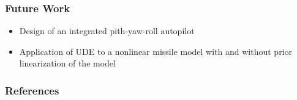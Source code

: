 \documentclass[table,10pt,red]{beamer}	%
\begin{document}
\begin{frame}
\frametitle{Future Work}
\begin{itemize}

	\item Design of an integrated pith-yaw-roll autopilot 
	\bigskip
	\item Application of UDE to a nonlinear missile model with and without prior linearization of the model
	
\end{itemize}
\end{frame}


\begin{frame}
	\frametitle{References}
\end{frame}
\end{document}
